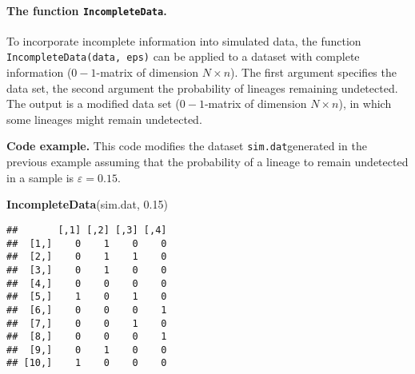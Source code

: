 \documentclass[
]{article}
\newenvironment{Shaded}{\begin{snugshade}}{\end{snugshade}}
\newcommand{\FloatTok}[1]{\textcolor[rgb]{0.00,0.00,0.81}{#1}}
\newcommand{\FunctionTok}[1]{\textcolor[rgb]{0.13,0.29,0.53}{\textbf{#1}}}
\newcommand{\NormalTok}[1]{#1}
\begin{document}
\hypertarget{the-function-incompletedata.}{%
\paragraph{\texorpdfstring{The function
\texttt{IncompleteData}.}{The function IncompleteData.}}\label{the-function-incompletedata.}}

To incorporate incomplete information into simulated data, the function
\texttt{IncompleteData(data,\ eps)} can be applied to a dataset with
complete information (\(0-1\)-matrix of dimension \(N\times n\)). The
first argument specifies the data set, the second argument the
probability of lineages remaining undetected. The output is a modified
data set (\(0-1\)-matrix of dimension \(N\times n\)), in which some
lineages might remain undetected.

\textbf{Code example.} This code modifies the dataset
\texttt{sim.dat}generated in the previous example assuming that the
probability of a lineage to remain undetected in a sample is
\(\varepsilon = 0.15\).

\begin{Shaded}
\begin{Highlighting}[]
\FunctionTok{IncompleteData}\NormalTok{(sim.dat, }\FloatTok{0.15}\NormalTok{) }
\end{Highlighting}
\end{Shaded}

\begin{verbatim}
##       [,1] [,2] [,3] [,4]
##  [1,]    0    1    0    0
##  [2,]    0    1    1    0
##  [3,]    0    1    0    0
##  [4,]    0    0    0    0
##  [5,]    1    0    1    0
##  [6,]    0    0    0    1
##  [7,]    0    0    1    0
##  [8,]    0    0    0    1
##  [9,]    0    1    0    0
## [10,]    1    0    0    0
\end{verbatim}
\end{document}
